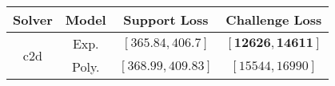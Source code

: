 \begin{tabular}{cc|c|c} 
\hline 
 Solver & Model & Support Loss  & Challenge Loss \tabularnewline\hline 
\hline 
\multirow{2}{*}{c2d} & Exp. & $\mathbf{\left[365.84,406.7\right]}$ & $\mathbf{\left[12626,14611\right]}$ \tabularnewline 
 & Poly. & $\left[368.99,409.83\right]$ & $\left[15544,16990\right]$ \tabularnewline 
\hline 
\end{tabular} 

